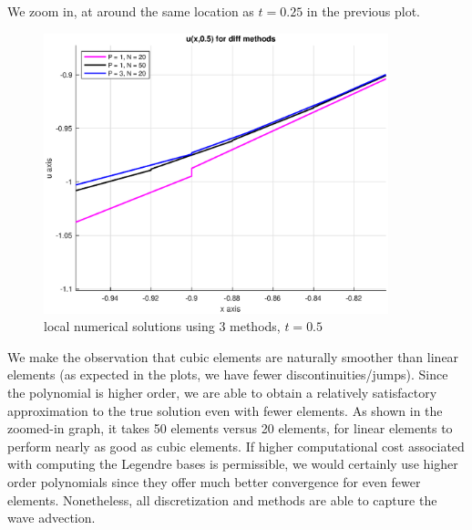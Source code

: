 \documentclass[12pt]{article} %
\newcommand{\1}[1]{\mathds{1}\left[#1\right]}
\begin{document}
We zoom in, at around the same location as $t = 0.25$ in the previous plot.
\newpage
\begin{figure}[t]
\includegraphics[width=10cm]{zoom2.eps}
\centering
\caption{local numerical solutions using 3 methods, $t = 0.5$}
\end{figure}

\newpage
We make the observation that cubic elements are naturally smoother than linear elements (as expected in the plots, we have fewer discontinuities/jumps). Since the polynomial is higher order, we are able to obtain a relatively satisfactory approximation to the true solution even with fewer elements. As shown in the zoomed-in graph, it takes 50 elements versus 20 elements, for linear elements to perform nearly as good as cubic elements. If higher computational cost associated with computing the Legendre bases is permissible, we would certainly use higher order polynomials since they offer much better convergence for even fewer elements. Nonetheless, all discretization and methods are able to capture the wave advection.

\end{document}
